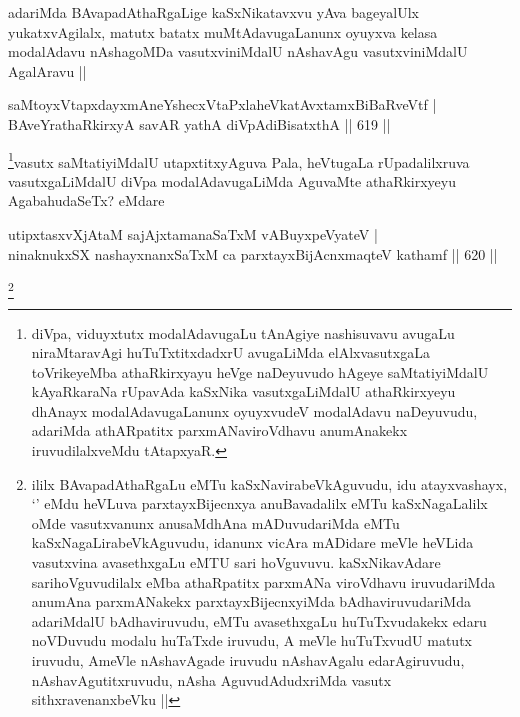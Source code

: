 \begin{artha}
adariMda BAvapadAthaRgaLige kaSxNikatavxvu yAva bageyalUlx yukatxvAgilalx, matutx batatx muMtAdavugaLanunx oyuyxva kelasa modalAdavu nAshagoMDa vasutxviniMdalU nAshavAgu vasutxviniMdalU AgalAravu ||
\end{artha}


\begin{shl}
saMtoyxVtapxdayxmAneYshecxVtaPxlaheVkatAvxtamxBiBaRveVtf | \\
BAveYrathaRkirxyA savAR yathA diVpAdiBisatxthA \hfill||  619 ||  
\end{shl}

\begin{artha}
\footnote{diVpa, viduyxtutx modalAdavugaLu tAnAgiye nashisuvavu avugaLu niraMtaravAgi huTuTxtitxdadxrU avugaLiMda elAlxvasutxgaLa toVrikeyeMba athaRkirxyayu heVge naDeyuvudo hAgeye saMtatiyiMdalU kAyaRkaraNa rUpavAda kaSxNika vasutxgaLiMdalU athaRkirxyeyu dhAnayx modalAdavugaLanunx oyuyxvudeV modalAdavu naDeyuvudu, adariMda athARpatitx parxmANaviroVdhavu anumAnakekx iruvudilalxveMdu tAtapxyaR.}vasutx saMtatiyiMdalU utapxtitxyAguva Pala, heVtugaLa rUpadalilxruva vasutxgaLiMdalU diVpa modalAdavugaLiMda AguvaMte athaRkirxyeyu AgabahudaSeTx? eMdare
\end{artha}


\begin{shl}
utipxtasxvXjAtaM sajAjxtamanaSaTxM vA\s BuyxpeVyateV | \\
ninaknukxSX nashayxnanxSaTxM ca parxtayxBijAcnxmaqteV kathamf \hfill||  620 ||  
\end{shl}

\begin{artha}
\footnote{ililx BAvapadAthaRgaLu eMTu kaSxNavirabeVkAguvudu, idu atayxvashayx, `\stext' eMdu heVLuva parxtayxBijecnxya anuBavadalilx eMTu kaSxNagaLalilx oMde vasutxvanunx anusaMdhAna mADuvudariMda eMTu kaSxNagaLirabeVkAguvudu, idanunx vicAra mADidare meVle heVLida vasutxvina avasethxgaLu eMTU sari hoVguvuvu. kaSxNikavAdare sarihoVguvudilalx eMba athaRpatitx parxmANa viroVdhavu iruvudariMda anumAna parxmANakekx parxtayxBijecnxyiMda bAdhaviruvudariMda adariMdalU bAdhaviruvudu, eMTu avasethxgaLu huTuTxvudakekx edaru noVDuvudu modalu huTaTxde iruvudu, A meVle huTuTxvudU matutx iruvudu, AmeVle nAshavAgade iruvudu nAshavAgalu edarAgiruvudu, nAshavAgutitxruvudu, nAsha AguvudAdudxriMda vasutx sithxravenanxbeVku ||}
\end{artha}

